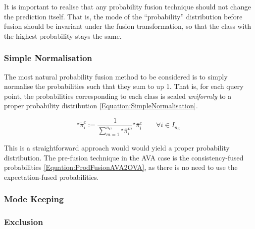 			It is important to realise that any probability fusion technique should not change the prediction itself. That is, the mode of the ``probability'' distribution before fusion should be invariant under the fusion transformation, so that the class with the highest probability stays the same.
				
				
			\subsubsection{Simple Normalisation}
			\label{BenthicHabitatMapping:Classification:ProbabilityFusion:SimpleNormalisation}
				
				The most natural probability fusion method to be considered is to simply normalise the probabilities such that they sum to up 1. That is, for each query point, the probabilities corresponding to each class is scaled \textit{uniformly} to a proper probability distribution \eqref{Equation:SimpleNormalisation}.
				
				\begin{equation}
					{^{\star}}\tilde{\pi}^{c}_{i} := \frac{1}{\sum_{m = 1}^{n_{C}} {^{\star}}\bar{\pi}^{m}_{i}} {^{\star}}\bar{\pi}^{c}_{i} \qquad \forall i \in I_{n_{C}}
				\label{Equation:SimpleNormalisation}
				\end{equation}				
				
				This is a straightforward approach would would yield a proper probability distribution. The pre-fusion technique in the AVA case is the consistency-fused probabilities \eqref{Equation:ProdFusionAVA2OVA}, as there is no need to use the expectation-fused probabilities.
				
			\subsubsection{Mode Keeping}
			\label{BenthicHabitatMapping:Classification:ProbabilityFusion:ModeKeeping}
				
			\subsubsection{Exclusion}
			\label{BenthicHabitatMapping:Classification:ProbabilityFusion:Exclusion}
			
